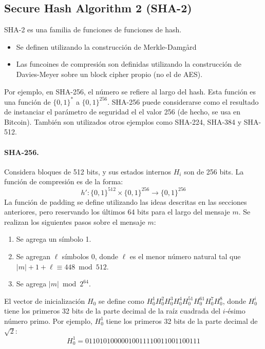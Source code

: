 \subsection{Secure Hash Algorithm 2 (SHA-2)}
SHA-2 es una familia de funciones de funciones de hash.
\begin{itemize}
    \item Se definen utilizando la construcción de Merkle-Damgård
    \item Las funcoines de compresión son definidas utilizando la construcción de Davies-Meyer sobre un block cipher propio (no el de AES).
\end{itemize}
Por ejemplo, en SHA-256, el número se refiere al largo del hash. Esta función es una función de $\{0,1\}^*$ a $\{0,1\}^{256}$. SHA-256 puede considerarse como el resultado de instanciar el parámetro de seguridad el el valor 256 (de hecho, se usa en Bitcoin). También son utilizados otros ejemplos como SHA-224, SHA-384 y SHA-512. 

\paragraph{SHA-256.} Considera bloques de 512 bits, y sus estados internos $H_i$ son de 256 bits. La función de compresión es de la forma:
$$
h':\{0,1\}^{512} \times \{0,1\}^{256} \to \{0,1\}^{256}
$$
La función de padding se define utilizando las ideas descritas en las secciones anteriores, pero reservando los últimos 64 bits para el largo del mensaje $m$. Se realizan los siguientes pasos sobre el mensaje $m$:
\begin{enumerate}
    \item Se agrega un símbolo 1.
    \item Se agregan $\ell$ símbolos 0, donde $\ell$ es el menor número natural tal que $|m| + 1 + \ell \equiv 448 \bmod 512$.
    \item Se agrega $|m| \bmod 2^{64}$.
\end{enumerate}
El vector de inicialización $H_0$ se define como $H_0^1H_0^2H_0^3H_0^4H_0^51H_0^61H_0^7H_0^8$, donde $H_0^i$ tiene los primeros 32 bits de la parte decimal de la raíz cuadrada del $i$-ésimo número primo. Por ejemplo, $H_0^1$ tiene los primeros 32 bits de la parte decimal de $\sqrt{2}$:
$$
H_0^1 = 01101010000010011110011001100111
$$

